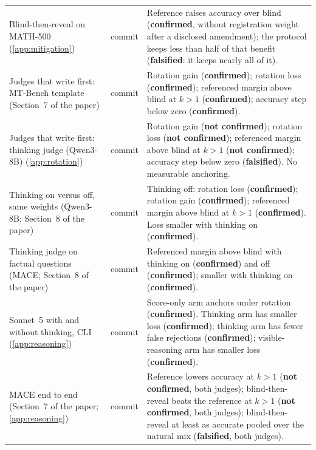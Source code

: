 {\begin{longtable}{L{3.2cm}L{1.1cm}L{8.7cm}}
Blind-then-reveal on MATH-500 (\cref{app:mitigation}) & commit & Reference raises accuracy over blind (\textbf{confirmed}, without registration weight after a disclosed amendment); the protocol keeps less than half of that benefit (\textbf{falsified}: it keeps nearly all of it). \\
Judges that write first: MT-Bench template (Section~7 of the paper) & commit & Rotation gain (\textbf{confirmed}); rotation loss (\textbf{confirmed}); referenced margin above blind at $k{>}1$ (\textbf{confirmed}); accuracy step below zero (\textbf{confirmed}). \\
Judges that write first: thinking judge (Qwen3-8B) (\cref{app:rotation}) & commit & Rotation gain (\textbf{not confirmed}); rotation loss (\textbf{not confirmed}); referenced margin above blind at $k{>}1$ (\textbf{not confirmed}); accuracy step below zero (\textbf{falsified}). No measurable anchoring. \\
Thinking on versus off, same weights (Qwen3-8B; Section~8 of the paper) & commit & Thinking off: rotation loss (\textbf{confirmed}); rotation gain (\textbf{confirmed}); referenced margin above blind at $k{>}1$ (\textbf{confirmed}). Loss smaller with thinking on (\textbf{confirmed}). \\
Thinking judge on factual questions (\textsc{MACE}; Section~8 of the paper) & commit & Referenced margin above blind with thinking on (\textbf{confirmed}) and off (\textbf{confirmed}); smaller with thinking on (\textbf{confirmed}). \\
Sonnet~5 with and without thinking, CLI (\cref{app:reasoning}) & commit & Score-only arm anchors under rotation (\textbf{confirmed}). Thinking arm has smaller loss (\textbf{confirmed}); thinking arm has fewer false rejections (\textbf{confirmed}); visible-reasoning arm has smaller loss (\textbf{confirmed}). \\
\textsc{MACE} end to end (Section~7 of the paper; \cref{app:reasoning}) & commit & Reference lowers accuracy at $k{>}1$ (\textbf{not confirmed}, both judges); blind-then-reveal beats the reference at $k{>}1$ (\textbf{not confirmed}, both judges); blind-then-reveal at least as accurate pooled over the natural mix (\textbf{falsified}, both judges). \\

\end{longtable}}
